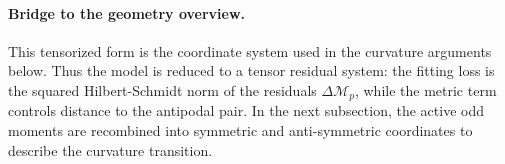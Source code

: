 \paragraph{Bridge to the geometry overview.}
This tensorized form is the coordinate system used in the curvature arguments below.
Thus the model is reduced to a tensor residual system: the fitting loss is the squared Hilbert-Schmidt norm of the residuals \(\Delta\mathcal M_p\), while the metric term controls distance to the antipodal pair. In the next subsection, the active odd moments are recombined into symmetric and anti-symmetric coordinates to describe the curvature transition.
